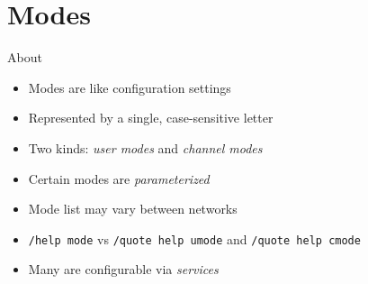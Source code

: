 \documentclass{beamer}
\begin{document}
\section{Modes}

\begin{frame}{About}
\begin{itemize}
	\item Modes are like configuration settings
	\item Represented by a single, case-sensitive letter
	\item Two kinds: \emph{user modes} and \emph{channel modes}
	\item Certain modes are \emph{parameterized}
	\item Mode list may vary between networks
	\item \texttt{/help mode} vs \texttt{/quote help umode} and \texttt{/quote help cmode}
	\item Many are configurable via \emph{services}
\end{itemize}
\end{frame}
\end{document}
